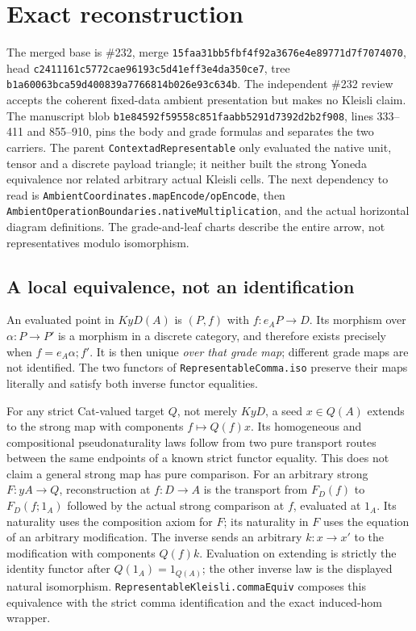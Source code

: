 \documentclass[11pt]{article}
\newcommand{\code}[1]{\nolinkurl{#1}}
\begin{document}
\section*{Exact reconstruction}
The merged base is \#232, merge \code{15faa31bb5fbf4f92a3676e4e89771d7f7074070}, head \code{c2411161c5772cae96193c5d41eff3e4da350ce7}, tree \code{b1a60063bca59d400839a7766814b026e93c634b}. The independent \#232 review accepts the coherent fixed-data ambient presentation but makes no Kleisli claim. The manuscript blob \code{b1e84592f59558c851faabb5291d7392d2b2f908}, lines 333--411 and 855--910, pins the body and grade formulas and separates the two carriers. The parent \code{ContextadRepresentable} only evaluated the native unit, tensor and a discrete payload triangle; it neither built the strong Yoneda equivalence nor related arbitrary actual Kleisli cells. The next dependency to read is \code{AmbientCoordinates.mapEncode/opEncode}, then \code{AmbientOperationBoundaries.nativeMultiplication}, and the actual horizontal diagram definitions. The grade-and-leaf charts describe the entire arrow, not representatives modulo isomorphism.

\subsection*{A local equivalence, not an identification}
An evaluated point in $K yD(A)$ is $(P,f)$ with $f:e_AP\to D$. Its morphism over $\alpha:P\to P'$ is a morphism in a discrete category, and therefore exists precisely when $f=e_A\alpha;f'$. It is then unique \emph{over that grade map}; different grade maps are not identified. The two functors of \code{RepresentableComma.iso} preserve their maps literally and satisfy both inverse functor equalities.

For any strict Cat-valued target $Q$, not merely $K yD$, a seed $x\in Q(A)$ extends to the strong map with components $f\mapsto Q(f)x$. Its homogeneous and compositional pseudonaturality laws follow from two pure transport routes between the same endpoints of a known strict functor equality. This does not claim a general strong map has pure comparison. For an arbitrary strong $F:yA\to Q$, reconstruction at $f:D\to A$ is the transport from $F_D(f)$ to $F_D(f;1_A)$ followed by the actual strong comparison at $f$, evaluated at $1_A$. Its naturality uses the composition axiom for $F$; its naturality in $F$ uses the equation of an arbitrary modification. The inverse sends an arbitrary $k:x\to x'$ to the modification with components $Q(f)k$. Evaluation on extending is strictly the identity functor after $Q(1_A)=1_{Q(A)}$; the other inverse law is the displayed natural isomorphism. \code{RepresentableKleisli.commaEquiv} composes this equivalence with the strict comma identification and the exact induced-hom wrapper.
\end{document}
